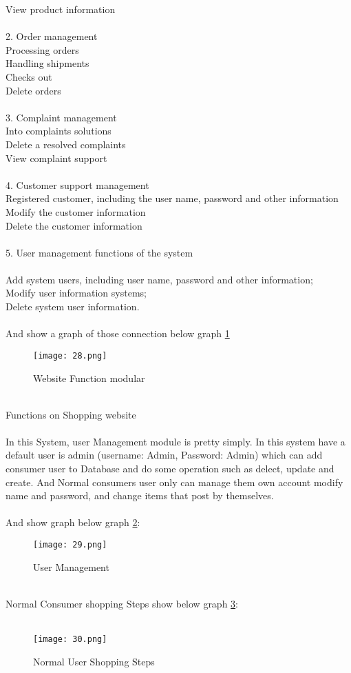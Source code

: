   View product information\\
  \\
2. Order management\\
  Processing orders\\
  Handling shipments\\
  Checks out\\
  Delete orders\\ 
\\
3. Complaint management\\
  Into complaints solutions\\
  Delete a resolved complaints\\
  View complaint support\\
  \\
4. Customer support management\\
  Registered customer, including the user name, password and other information\\
  Modify the customer information\\
  Delete the customer information\\
  \\
5. User management functions of the system\\
\\
  Add system users, including user name, password and other information;\\
  Modify user information systems;\\
  Delete system user information.\\
\\
And show a graph of those connection below graph \ref{fig:3 cubed graph}\\
\begin{figure}[h]
	\centering
	\texttt{[image: 28.png]}
	\caption{Website Function modular}
	\label{fig:3 cubed graph}
\end{figure}
\\
Functions on Shopping website\\
 \\
	In this System, user Management module is pretty simply. In this system have a default user is admin (username: Admin, Password: Admin) which can add consumer user to Database and do some operation such as delect, update and create. And Normal consumers user only can manage them own account modify name and password, and change items that post by themselves.\\
	\\
And show graph below graph \ref{fig:4 cubed graph}:
\\
\begin{figure}[h]
	\centering
	\texttt{[image: 29.png]}
	\caption{User Management}
	\label{fig:4 cubed graph}
\end{figure}
\\
Normal Consumer shopping Steps show below graph \ref{fig:5 cubed graph}:\\
\\
\begin{figure}[h]
	\centering
	\texttt{[image: 30.png]}
	\caption{Normal User Shopping Steps}
	\label{fig:5 cubed graph}
\end{figure}
  \\
